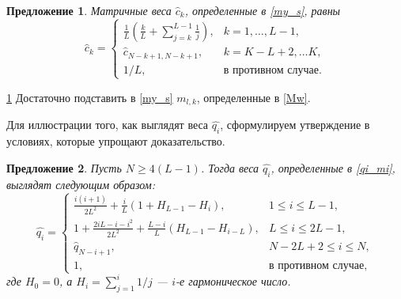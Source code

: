 \documentclass[12pt,a4paper,fleqn,leqno]{article}
\newtheorem{proposition}{Предложение}
\begin{document}
\begin{proposition} \label{myweightstat}
Матричные веса $\hat c_k$, определенные в \eqref{my_s}, равны
\begin{equation*}
\hat c_k = \begin{cases}
\frac{1}{L}\left(\frac{k}{L} + \sum_{j=k}^{L-1} \frac{1}{j} \right),& k = 1, \ldots, L-1, \\
\hat c_{N - k + 1, N - k + 1}, & k = K - L + 2, \ldots K, \\
1/L, &\text{в противном случае}.
\end{cases}
\end{equation*}
\end{proposition}

\begin{proof5}{\ref{myweightstat}}
Достаточно подставить в \eqref{my_s} $m_{l,k}$, определенные в \eqref{Mw}.
\end{proof5}

Для иллюстрации того, как выглядят веса $\hat{q_i}$, сформулируем утверждение в условиях, которые упрощают доказательство.

\begin{proposition} \label{myserweightstat}
Пусть $N \ge 4(L-1)$. Тогда веса $\hat{q_i}$, определенные в \eqref{qi_mi},
выглядят следующим образом:
\begin{equation*}
\hat{q_i} = \begin{cases}
\frac{i(i+1)}{2 L^2} + \frac{i}{L}(1 + H_{L-1} - H_i), &1 \le i \le L-1, \\
1 + \frac{2iL-i-i^2}{2L^2} + \frac{L-i}{L}(H_{L-1} - H_{i - L}), & L \le i \le 2L-1, \\
\hat{q}_{N-i+1}, &N-2L+2 \le i \le N, \\
1, &\text{в противном случае},
\end{cases}
\end{equation*}
где $H_0 = 0$, а $H_i = \sum_{j=1}^i 1/j$ --- $i$-е гармоническое число.
\end{proposition}
\end{document}
